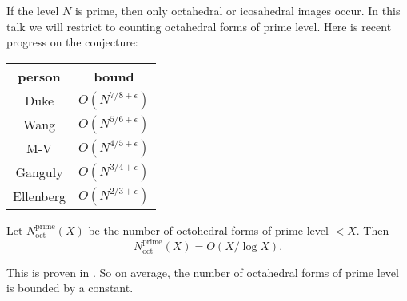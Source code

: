 If the level $N$ is prime, then only octahedral or icosahedral images occur. 
In this talk we will restrict to counting octahedral forms of prime level. Here 
is recent progress on the conjecture:
\begin{center}
\begin{tabular}{c|c}
person & bound \\ \hline
Duke & $O(N^{7/8+\epsilon})$ \\
Wang & $O(N^{5/6+\epsilon})$ \\
M-V & $O(N^{4/5+\epsilon})$ \\
Ganguly & $O(N^{3/4+\epsilon})$ \\
Ellenberg & $O(N^{2/3+\epsilon})$
\end{tabular}
\end{center}

\begin{theo}
Let $N_\mathrm{oct}^\mathrm{prime}(X)$ be the number of octohedral forms of 
prime level $<X$. Then 
\[
  N_\mathrm{oct}^\mathrm{prime}(X) = O(X/\log X) .
\]
\end{theo}
This is proven in \cite{bg09}. So on average, the number of octahedral forms 
of prime level is bounded by a constant. 

